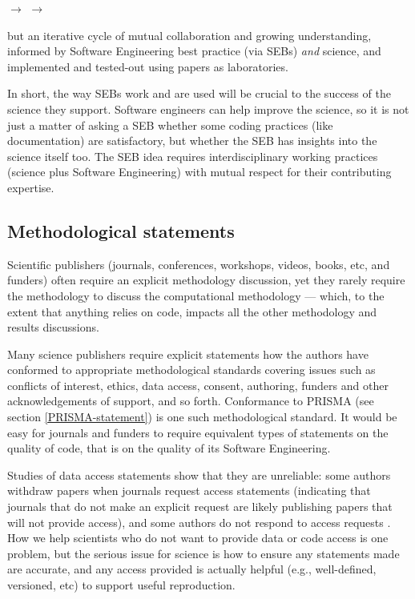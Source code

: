 \documentclass{comjnl}
\begin{document}
\begin{center}\sf{} $\rightarrow$  $\rightarrow$ 
\end{center}

\noindent but an iterative cycle of mutual collaboration and growing understanding, informed by Software Engineering best practice (via SEBs) \emph{and\/} science, and implemented and tested-out using papers as laboratories.

In short, the way SEBs work and are used will be crucial to the success of the science they support. Software engineers can help improve the science, so it is not just a matter of asking a SEB whether some coding practices (like documentation) are satisfactory, but whether the SEB has insights into the science itself too. The SEB idea requires interdisciplinary working practices (science plus Software Engineering) with mutual respect for their contributing expertise.

\subsection{Methodological statements}
Scientific publishers (journals, conferences, workshops, videos, books, etc, and funders) often require an explicit methodology discussion, yet they rarely require the methodology to discuss the computational methodology --- which, to the extent that anything relies on code, impacts all the other methodology and results discussions.

Many science publishers require explicit statements how the authors have conformed to appropriate methodological standards covering issues such as conflicts of interest, ethics, data access, consent, authoring, funders and other acknowledgements of support, and so forth. Conformance to PRISMA (see section \ref{PRISMA-statement}) is one such methodological standard. It would be easy for journals and funders to require equivalent types of statements on the quality of code, that is on the quality of its Software Engineering.

Studies of data access statements show that they are unreliable: some authors withdraw papers when journals request access statements \cite{no-raw-data} (indicating that journals that do not make an explicit request are likely publishing papers that will not provide access), and some authors do not respond to access requests \cite{data-access}. How we help scientists who do not want to provide data or code access is one problem, but the serious issue for science is how to ensure any statements made are accurate, and any access provided is actually helpful (e.g., well-defined, versioned, etc) to support useful reproduction. 
\end{document}
